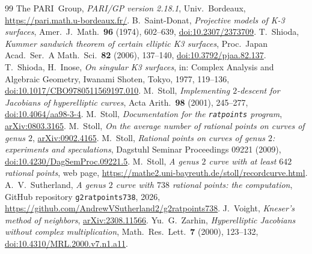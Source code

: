 \documentclass[11pt]{article}
\theoremstyle{remark}
\begin{document}
\begin{thebibliography}{99}
 The PARI~Group, \emph{PARI/GP version 2.18.1}, Univ.\ Bordeaux, \url{https://pari.math.u-bordeaux.fr/}.
 B.~Saint-Donat, \emph{Projective models of K-3 surfaces}, Amer.\ J.\ Math.\ \textbf{96} (1974), 602--639, \href{https://doi.org/10.2307/2373709}{doi:10.2307/2373709}.
 T.~Shioda, \emph{Kummer sandwich theorem of certain elliptic K3 surfaces}, Proc.\ Japan Acad.\ Ser.~A Math.\ Sci.\ \textbf{82} (2006), 137--140, \href{https://doi.org/10.3792/pjaa.82.137}{doi:10.3792/pjaa.82.137}.
 T.~Shioda, H.~Inose, \emph{On singular K3 surfaces}, in: Complex Analysis and Algebraic Geometry, Iwanami Shoten, Tokyo, 1977, 119--136, \href{https://doi.org/10.1017/CBO9780511569197.010}{doi:10.1017/CBO9780511569197.010}.
 M.~Stoll, \emph{Implementing $2$-descent for Jacobians of hyperelliptic curves}, Acta Arith.\ \textbf{98} (2001), 245--277, \href{https://doi.org/10.4064/aa98-3-4}{doi:10.4064/aa98-3-4}.
 M.~Stoll, \emph{Documentation for the \texttt{ratpoints} program}, \href{https://arxiv.org/abs/0803.3165}{arXiv:0803.3165}.
 M.~Stoll, \emph{On the average number of rational points on curves of genus $2$}, \href{https://arxiv.org/abs/0902.4165}{arXiv:0902.4165}.
 M.~Stoll, \emph{Rational points on curves of genus $2$: experiments and speculations}, Dagstuhl Seminar Proceedings 09221 (2009), \href{https://doi.org/10.4230/DagSemProc.09221.5}{doi:10.4230/DagSemProc.09221.5}.
 M.~Stoll, \emph{A genus $2$ curve with at least $642$ rational points}, web page, \url{https://mathe2.uni-bayreuth.de/stoll/recordcurve.html}.
 A.~V.~Sutherland, \emph{A genus $2$ curve with $738$ rational points: the computation}, GitHub repository \texttt{g2ratpoints738}, 2026, \url{https://github.com/AndrewVSutherland2/g2ratpoints738}.
 J.~Voight, \emph{Kneser's method of neighbors}, \href{https://arxiv.org/abs/2308.11566}{arXiv:2308.11566}.
 Yu.~G.~Zarhin, \emph{Hyperelliptic Jacobians without complex multiplication}, Math.\ Res.\ Lett.\ \textbf{7} (2000), 123--132, \href{https://doi.org/10.4310/MRL.2000.v7.n1.a11}{doi:10.4310/MRL.2000.v7.n1.a11}.
\end{thebibliography}

\appendix
\end{document}

